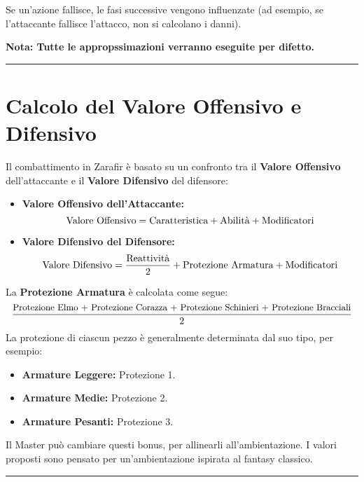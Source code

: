 \documentclass[../manuale_main.tex]{subfiles}
\begin{document}
Se un'azione fallisce, le fasi successive vengono influenzate (ad esempio, se l'attaccante fallisce l'attacco, non si calcolano i danni).

\textbf{Nota: Tutte le appropssimazioni verranno eseguite per difetto.}

\vspace{0.5cm}
\noindent
\begin{center}
\rule{\textwidth}{0.4pt} 
\end{center}
\vspace{0.5cm}
\clearpage
\section{Calcolo del Valore Offensivo e Difensivo}
Il combattimento in Zarafir è basato su un confronto tra il \textbf{Valore Offensivo} dell'attaccante e il \textbf{Valore Difensivo} del difensore:

\begin{itemize}
    \item \textbf{Valore Offensivo dell'Attaccante:}
    \[
    \textnormal{Valore Offensivo} = \textnormal{Caratteristica} + \textnormal{Abilità} + \textnormal{Modificatori}
    \]
    \item \textbf{Valore Difensivo del Difensore:}
    \[
    \textnormal{Valore Difensivo} = \frac{\textnormal{Reattività}}{2} + \textnormal{Protezione Armatura} + \textnormal{Modificatori}
    \]

\end{itemize}

La \textbf{Protezione Armatura} è calcolata come segue:
\[
\frac{\textnormal{\small{Protezione Elmo + Protezione Corazza + Protezione Schinieri + Protezione Bracciali}}}{2}
\]
La protezione di ciascun pezzo è generalmente determinata dal suo tipo, per esempio:
\begin{itemize}
    \item \textbf{Armature Leggere:} Protezione 1.
    \item \textbf{Armature Medie:} Protezione 2.
    \item \textbf{Armature Pesanti:} Protezione 3.
\end{itemize}
Il Master può cambiare questi bonus, per allinearli all'ambientazione. I valori proposti sono pensato per un'ambientazione ispirata al fantasy classico.

\vspace{0.5cm}
\noindent
\begin{center}
\rule{\textwidth}{0.4pt} 
\end{center}
\vspace{0.5cm}
\end{document}
